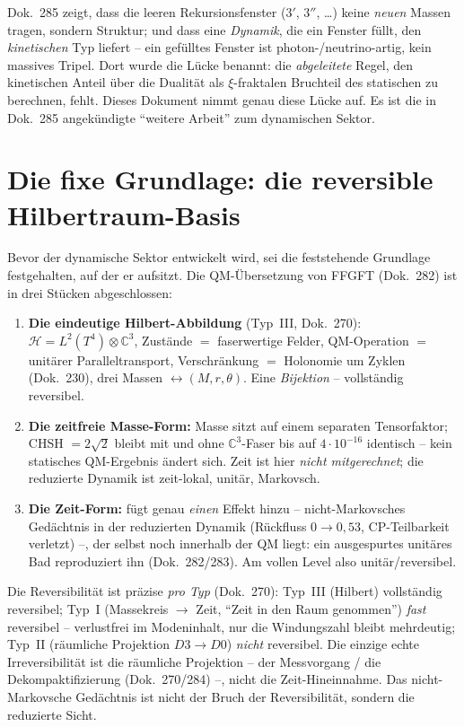 Dok.~285 zeigt, dass die leeren Rekursionsfenster ($3'$, $3''$, \dots) keine \emph{neuen} Massen
tragen, sondern Struktur; und dass eine \emph{Dynamik}, die ein Fenster füllt, den
\emph{kinetischen} Typ liefert -- ein gefülltes Fenster ist photon-/neutrino-artig, kein massives
Tripel. Dort wurde die Lücke benannt: die \emph{abgeleitete} Regel, den kinetischen Anteil über die
Dualität als $\xi$-fraktalen Bruchteil des statischen zu berechnen, fehlt. Dieses Dokument nimmt
genau diese Lücke auf. Es ist die in Dok.~285 angekündigte \enquote{weitere Arbeit} zum dynamischen
Sektor.

\section{Die fixe Grundlage: die reversible Hilbertraum-Basis}
Bevor der dynamische Sektor entwickelt wird, sei die feststehende Grundlage festgehalten, auf der er
aufsitzt. Die QM-Übersetzung von FFGFT (Dok.~282) ist in drei Stücken abgeschlossen:
\begin{enumerate}
  \item \textbf{Die eindeutige Hilbert-Abbildung} (Typ~III, Dok.~270): $\mathcal H=L^2(T^4)\otimes
  \mathbb C^3$, Zustände $=$ faserwertige Felder, QM-Operation $=$ unitärer Paralleltransport,
  Verschränkung $=$ Holonomie um Zyklen (Dok.~230), drei Massen $\leftrightarrow(M,r,\theta)$. Eine
  \emph{Bijektion} -- vollständig reversibel.
  \item \textbf{Die zeitfreie Masse-Form:} Masse sitzt auf einem separaten Tensorfaktor; CHSH
  $=2\sqrt2$ bleibt mit und ohne $\mathbb C^3$-Faser bis auf $4\cdot10^{-16}$ identisch -- kein
  statisches QM-Ergebnis ändert sich. Zeit ist hier \emph{nicht mitgerechnet}; die reduzierte
  Dynamik ist zeit-lokal, unitär, Markovsch.
  \item \textbf{Die Zeit-Form:} fügt genau \emph{einen} Effekt hinzu -- nicht-Markovsches Gedächtnis
  in der reduzierten Dynamik (Rückfluss $0\to0{,}53$, CP-Teilbarkeit verletzt) --, der selbst noch
  innerhalb der QM liegt: ein ausgespurtes unitäres Bad reproduziert ihn (Dok.~282/283). Am vollen
  Level also unitär/reversibel.
\end{enumerate}
Die Reversibilität ist präzise \emph{pro Typ} (Dok.~270): Typ~III (Hilbert) vollständig reversibel;
Typ~I (Massekreis $\to$ Zeit, \enquote{Zeit in den Raum genommen}) \emph{fast} reversibel --
verlustfrei im Modeninhalt, nur die Windungszahl bleibt mehrdeutig; Typ~II (räumliche Projektion
$D3\!\to\!D0$) \emph{nicht} reversibel. Die einzige echte Irreversibilität ist die räumliche
Projektion -- der Messvorgang / die Dekompaktifizierung (Dok.~270/284) --, nicht die Zeit-Hineinnahme.
Das nicht-Markovsche Gedächtnis ist nicht der Bruch der Reversibilität, sondern die reduzierte Sicht.

